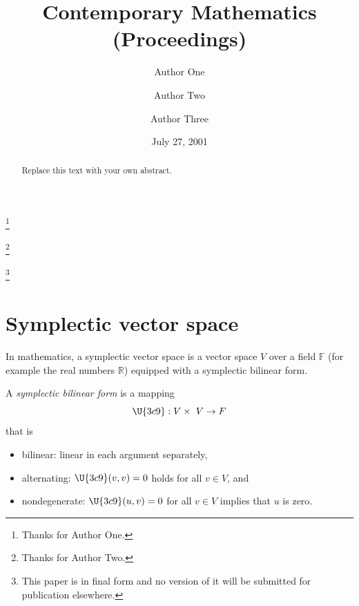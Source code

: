 \documentclass{conm-p-l}
\theoremstyle{definition}
\theoremstyle{remark}
\numberwithin{equation}{section}
\theoremstyle{plain}
\begin{document}
\title[Short Title]{Contemporary Mathematics (Proceedings)}
\author{Author One}
\address[A. One and A. Two]{Author OneTwo address line 1\\
Author OneTwo address line 2}
\thanks{Thanks for Author One.}
\author{Author Two}
\thanks{Thanks for Author Two.}
\author{Author Three}
\address[A. Three]{Author Three address line 1\\
Author Three address line 2}
\thanks{This paper is in final form and no version of it will be submitted
for publication elsewhere.}
\date{July 27, 2001}

\begin{abstract}
Replace this text with your own abstract.
\end{abstract}

\maketitle

\section{Symplectic vector space}

In mathematics, a symplectic vector space is a vector space $V$ over a field 
$\mathbb{F}$ (for example the real numbers $\mathbb{R}$) equipped with a
symplectic bilinear form.

A \emph{symplectic bilinear form} is a mapping 
\begin{equation}
\U{3c9} :V\times \ V\rightarrow F
\end{equation}
that is

\begin{itemize}
\item bilinear: linear in each argument separately,

\item alternating: $\U{3c9} (v,v)=0$ holds for all $v\in V$, and

\item nondegenerate: $\U{3c9} (u,v)=0$ for all $v\in V$ implies that $u$ is
zero.
\end{itemize}
\end{document}
